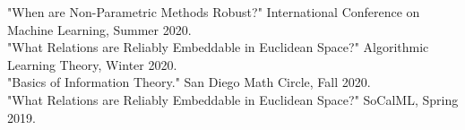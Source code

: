 \documentclass{res}
\begin{document}
\begin{resume}
"When are Non-Parametric Methods Robust?" International Conference on Machine Learning, Summer 2020. \\

"What Relations are Reliably Embeddable in Euclidean Space?" Algorithmic Learning Theory, Winter 2020. \\

"Basics of Information Theory." San Diego Math Circle, Fall 2020. \\

"What Relations are Reliably Embeddable in Euclidean Space?" SoCalML, Spring 2019. \\

\end{resume}
\end{document}
